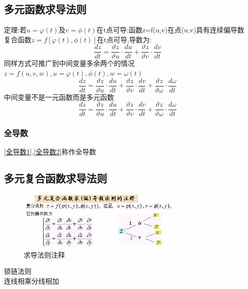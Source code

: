 \documentclass[10pt, a4paper, oneside]{ctexart}
\begin{document}
\begin{sloppypar}
	\subsection{多元函数求导法则}
	定理:若$u=\varphi(t)$及$v=\phi(t)$在t点可导;函数z=f(u,v)在点(u,v)具有连续偏导数
	复合函数$z=f[\varphi(t),\phi(t)]$在t点可导,导数为:
	$$\frac{dz}{dt}=\frac{\vartheta
			z}{\vartheta u}\cdot\frac{du}{dt}+\frac{\vartheta z}{\vartheta v}\cdot\frac{dv}{dt}$$
	同样方式可推广到中间变量多余两个的情况$z=f(u,v,w),u = \varphi(t), \phi(t), w=\omega(t)$
	\setcounter{equation}{0}
	\begin{equation}\label{全导数1}
		\frac{dz}{dt}=\frac{\vartheta
			z}{\vartheta u}\cdot\frac{du}{dt}+\frac{\vartheta z}{\vartheta v}\cdot\frac{dv}{dt}+\frac{\vartheta
			z}{\vartheta \omega}\cdot\frac{d\omega}{dt}
	\end{equation}
	中间变量不是一元函数而是多元函数
	\begin{equation}\label{全导数2}
		\frac{dz}{dt}=\frac{\vartheta
			z}{\vartheta u}\cdot\frac{du}{dt}+\frac{\vartheta z}{\vartheta v}\cdot\frac{dv}{dt}+\frac{\vartheta
			z}{\vartheta \omega}\cdot\frac{d\omega}{dt}
	\end{equation}
	\subsubsection{全导数}
	\eqref{全导数1},\eqref{全导数2}称作全导数
	\subsection{多元复合函数求导法则}
	\begin{figure}[htbp]
		\centering
		\includegraphics[width=8cm]{image120.jpg}
		\caption{求导法则注释}
	\end{figure}
	锁链法则\\
	连线相乘分线相加

\end{sloppypar}
\end{document}
